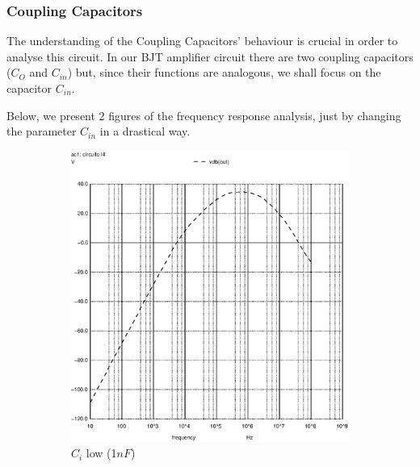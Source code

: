 \subsubsection{Coupling Capacitors}

The understanding of the Coupling Capacitors' behaviour is crucial in order to analyse this circuit. In our BJT amplifier circuit there are two coupling capacitors ($C_O$ and $C_{in}$) but, since their functions are analogous, we shall focus on the capacitor $C_{in}$.

Below, we present 2 figures of the frequency response analysis, just by changing the parameter $C_{in}$ in a drastical way.

\begin{figure}[h]
\centering
\begin{subfigure}{.5\textwidth}
    \centering
    \includegraphics[scale=0.33]{images/cilow_1n.eps}
    \caption{$C_i$ low (1$nF$)}
\end{subfigure}%
\begin{subfigure}{.5\textwidth}
    \centering

\end{subfigure}
\end{figure}
